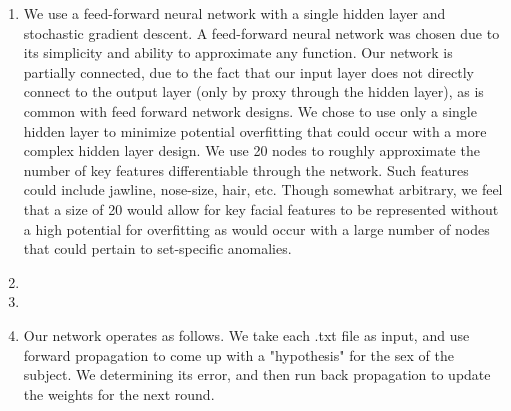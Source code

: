 \documentclass{article}
\title{ECS 170 - Programmng Assignment #3}
\author{Aaron Allen / Sean Johnson}
\date{March 15, 2017}
\begin{document}
\maketitle

\begin{enumerate}
\item 
We use a feed-forward neural network with a single hidden layer and stochastic gradient descent. A feed-forward neural network was chosen due to its simplicity and ability to approximate any function. Our network is partially connected, due to the fact that our input layer does not directly connect to the output layer (only by proxy through the hidden layer), as is common with feed forward network designs. We chose to use only a single hidden layer to minimize potential overfitting that could occur with a more complex hidden layer design. We use 20 nodes to roughly approximate the number of key features differentiable through the network. Such features could include jawline, nose-size, hair, etc. Though somewhat arbitrary, we feel that a size of 20 would allow for key facial features to be represented without a high potential for overfitting as would occur with a large number of nodes that could pertain to set-specific anomalies.
\item

\item

\item
Our network operates as follows. We take each .txt file as input, and use forward propagation to come up with a "hypothesis" for the sex of the subject. We determining its error, and then run back propagation to update the weights for the next round.




\end{enumerate}
\end{document}

